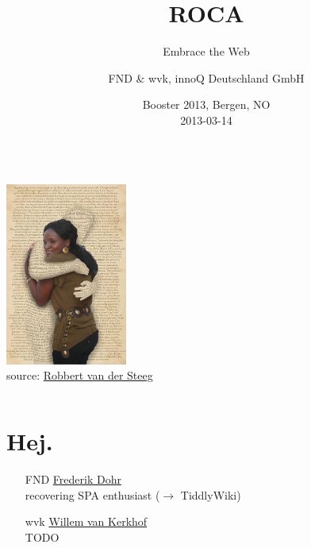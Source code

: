 \documentclass{beamer}
\date{Booster 2013, Bergen, NO \\ 2013-03-14}
\author{FND \& wvk, innoQ Deutschland GmbH}
\title{ROCA}
\subtitle{Embrace the Web}
\begin{document}
  {

  \begin{frame}[plain]
    \titlepage
  \end{frame}
}

\setcounter{tocdepth}{1}

\begin{frame}
  \begin{columns}
    \begin{column}{4.4cm}
      \includegraphics[width=4cm]{images/embrace.jpg}
      \\
      \tiny source: \href{http://www.flickr.com/photos/robbie73/4289385819/}{Robbert van der Steeg}
    \end{column}

    \begin{column}{6.6cm}
      \tableofcontents
    \end{column}
  \end{columns}
\end{frame}

\section{Hej.}

\begin{frame}{\insertsectionhead}
  \begin{itemize}
    \item[FND] \href{mailto:fnd@innoq.com}{Frederik Dohr} \\
        recovering SPA enthusiast (\ensuremath{\rightarrow} TiddlyWiki)
    \item[]
    \item[wvk] \href{mailto:wvk@innoq.com}{Willem van Kerkhof} \\
        TODO
  \end{itemize}

\end{frame}
\end{document}
